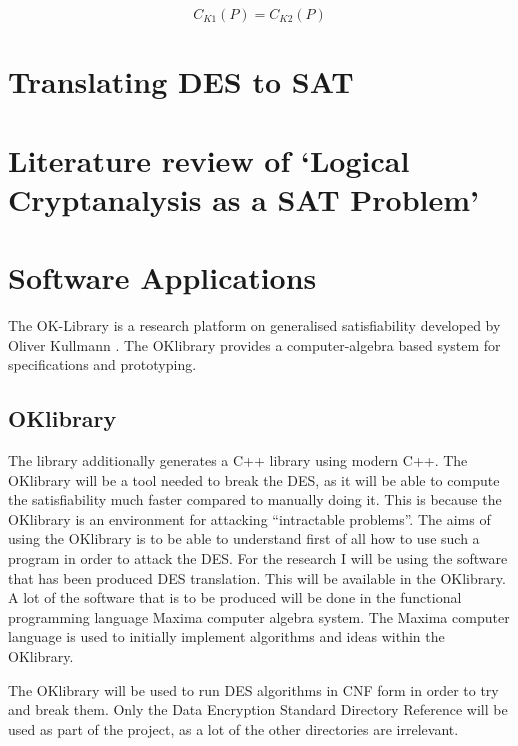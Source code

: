 \documentclass[11pt,a4paper]{report}
\begin{document}
\begin{displaymath}
C_{K1}(P) = C_{K2}(P)
\end{displaymath}


\chapter{Translating DES to SAT}
\label{cha:AppDESSAT}

\chapter{Literature review of `Logical Cryptanalysis as a SAT Problem'}




\chapter{Software Applications}
\label{cha:softApp}

The OK-Library is a research platform on generalised satisfiability developed by Oliver Kullmann \cite{Oliver2013OKlibrary}. The OKlibrary provides a computer-algebra based system for specifications and prototyping.

\section{OKlibrary}
\label{sec:OKl}
The library additionally generates a C++ library using modern C++.
The OKlibrary will be a tool needed to break the DES, as it will be able to compute the satisfiability much faster compared to manually doing it. This is because the OKlibrary is an environment for attacking “intractable problems”. The aims of using the OKlibrary is to be able to understand first of all how to use such a program in order to attack the DES.
For the research I will be using the software that has been produced DES translation. This will be available in the OKlibrary. A lot of the software that is to be produced will be done in the functional programming language Maxima computer algebra system. The Maxima computer language is used to initially implement algorithms and ideas within the OKlibrary.

The OKlibrary will be used to run DES algorithms in CNF form in order to try and break them. Only the Data Encryption Standard Directory Reference will be used as part of the project, as a lot of the other directories are irrelevant.
\end{document}
